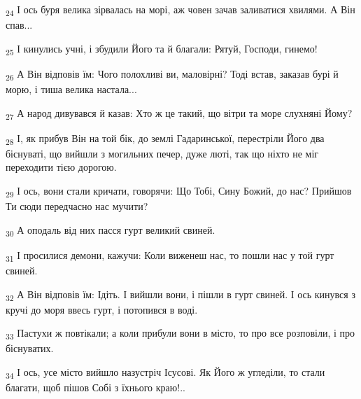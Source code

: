 \begin{tcolorbox}
\textsubscript{24} І ось буря велика зірвалась на морі, аж човен зачав заливатися хвилями. А Він спав...
\end{tcolorbox}
\begin{tcolorbox}
\textsubscript{25} І кинулись учні, і збудили Його та й благали: Рятуй, Господи, гинемо!
\end{tcolorbox}
\begin{tcolorbox}
\textsubscript{26} А Він відповів їм: Чого полохливі ви, маловірні? Тоді встав, заказав бурі й морю, і тиша велика настала...
\end{tcolorbox}
\begin{tcolorbox}
\textsubscript{27} А народ дивувався й казав: Хто ж це такий, що вітри та море слухняні Йому?
\end{tcolorbox}
\begin{tcolorbox}
\textsubscript{28} І, як прибув Він на той бік, до землі Гадаринської, перестріли Його два біснуваті, що вийшли з могильних печер, дуже люті, так що ніхто не міг переходити тією дорогою.
\end{tcolorbox}
\begin{tcolorbox}
\textsubscript{29} І ось, вони стали кричати, говорячи: Що Тобі, Сину Божий, до нас? Прийшов Ти сюди передчасно нас мучити?
\end{tcolorbox}
\begin{tcolorbox}
\textsubscript{30} А оподаль від них пасся гурт великий свиней.
\end{tcolorbox}
\begin{tcolorbox}
\textsubscript{31} І просилися демони, кажучи: Коли виженеш нас, то пошли нас у той гурт свиней.
\end{tcolorbox}
\begin{tcolorbox}
\textsubscript{32} А Він відповів їм: Ідіть. І вийшли вони, і пішли в гурт свиней. І ось кинувся з кручі до моря ввесь гурт, і потопився в воді.
\end{tcolorbox}
\begin{tcolorbox}
\textsubscript{33} Пастухи ж повтікали; а коли прибули вони в місто, то про все розповіли, і про біснуватих.
\end{tcolorbox}
\begin{tcolorbox}
\textsubscript{34} І ось, усе місто вийшло назустріч Ісусові. Як Його ж угледіли, то стали благати, щоб пішов Собі з їхнього краю!..
\end{tcolorbox}
